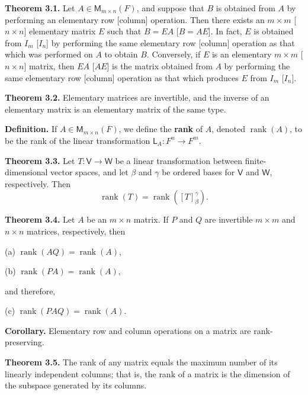 \documentclass{article}
\newcommand{\0}{\mathit{0}}
\begin{document}
\medskip

\textbf{Theorem 3.1.} Let $A \in \mathsf{M}_{m \times n}(F)$, and suppose that $B$ is obtained from 
$A$ by performing an elementary row [column] operation. Then there exists an 
$m \times m$ [$n \times n$] elementary matrix $E$ such that $B = EA$ [$B = AE$]. In fact, 
$E$ is obtained from $I_m$ [$I_n$] by performing the same elementary row [column] 
operation as that which was performed on $A$ to obtain $B$. Conversely, if $E$ is 
an elementary $m \times m$ [$n \times n$] matrix, then $EA$ [$AE$] is the matrix obtained 
from $A$ by performing the same elementary row [column] operation as that 
which produces $E$ from $I_m$ [$I_n$].

\medskip

\textbf{Theorem 3.2.} Elementary matrices are invertible, and the inverse of an 
elementary matrix is an elementary matrix of the same type.

\medskip

\textbf{Definition.} If $A \in \mathsf{M}_{m \times n}(F)$, we define the \textbf{rank} of $A$, 
denoted $\operatorname{rank}(A)$, to be the rank of the linear transformation 
$\mathsf{L}_A : F^n \to F^m$.

\medskip

\textbf{Theorem 3.3.} Let $T: \mathsf{V} \to \mathsf{W}$ be a linear transformation between 
finite-dimensional vector spaces, and let $\beta$ and $\gamma$ be ordered bases for 
$\mathsf{V}$ and $\mathsf{W}$, respectively. Then
\[
\operatorname{rank}(T) = \operatorname{rank}\left( [T]^\gamma_\beta \right).
\]

\medskip

\textbf{Theorem 3.4.} Let $A$ be an $m \times n$ matrix. If $P$ and $Q$ are invertible 
$m \times m$ and $n \times n$ matrices, respectively, then 
 
(a) $\operatorname{rank}(AQ) = \operatorname{rank}(A)$,

(b) $\operatorname{rank}(PA) = \operatorname{rank}(A)$,

and therefore,  

(c) $\operatorname{rank}(PAQ) = \operatorname{rank}(A)$.

\medskip

\textbf{Corollary.} Elementary row and column operations on a matrix are rank-preserving.

\medskip

\textbf{Theorem 3.5.} The rank of any matrix equals the maximum number of its 
linearly independent columns; that is, the rank of a matrix is the dimension 
of the subspace generated by its columns.
\end{document}
